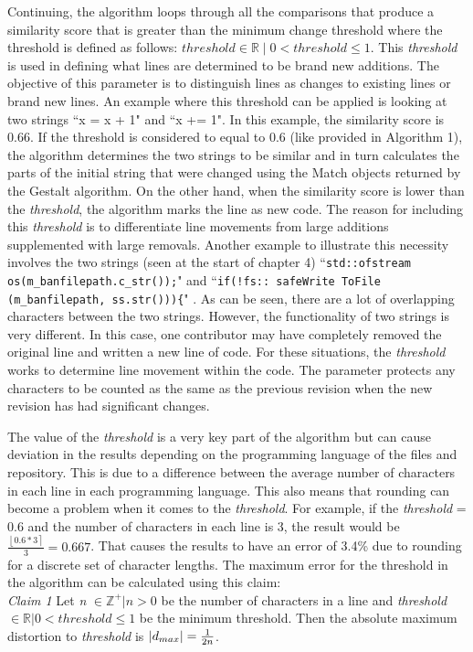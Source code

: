 Continuing, the algorithm loops through all the comparisons that produce a similarity score that is greater than the minimum change threshold \citep{10.1007/s10664-017-9575-4} where the threshold is defined as follows: 
$threshold \in \mathbb{R} \mid 0 < threshold \leq 1$. This \textit{threshold} is used in defining what lines are determined to be brand new additions. The objective of this parameter is to distinguish lines as changes to existing lines or brand new lines. An example where this threshold can be applied is looking at two strings ``x = x + 1" and ``x += 1". In this example, the similarity score is 0.66. If the threshold is considered to equal to 0.6 (like provided in Algorithm 1), the algorithm determines the two strings to be similar and in turn calculates the parts of the initial string that were changed using the Match objects returned by the Gestalt algorithm. On the other hand, when the similarity score is lower than the \textit{threshold}, the algorithm marks the line as new code. The reason for including this \textit{threshold} is to differentiate line movements from large additions supplemented with large removals. Another example to illustrate this necessity involves the two strings (seen at the start of chapter 4) ``\texttt{std::ofstream os(m\_banfilepath.c\_str());}" and ``\texttt{if(!fs:: safeWrite ToFile (m\_banfilepath, ss.str()))\{}" \citep{10.1007/s10664-017-9575-4}. As can be seen, there are a lot of overlapping characters between the two strings. However, the functionality of two strings is very different. In this case, one contributor may have completely removed the original line and written a new line of code. For these situations, the \textit{threshold} works to determine line movement within the code. The parameter protects any characters to be counted as the same as the previous revision when the new revision has had significant changes. 

The value of the \textit{threshold} is a very key part of the algorithm but can cause deviation in the results depending on the programming language of the files and repository. This is due to a difference between the average number of characters in each line in each programming language. This also means that rounding can become a problem when it comes to the \textit{threshold}. For example, if the \textit{threshold} = 0.6 and the number of characters in each line is 3, the result would be $\frac{\left \lfloor{0.6 * 3}\right \rceil}{3} = 0.667$. That causes the results to have an error of 3.4\% due to rounding for a discrete set of character lengths. The maximum error for the threshold in the algorithm can be calculated using this claim:\\
\newline
\textit{Claim 1} Let \textit{n} $\in \mathbb{Z}^+ | n > 0$ be the number of characters in a line and \textit{threshold} $\in \mathbb{R} | 0 < threshold \leq 1$ be the minimum threshold. Then the absolute maximum distortion to \textit{threshold} is $\lvert d_{max}\rvert = \frac{1}{2n}$.\\

